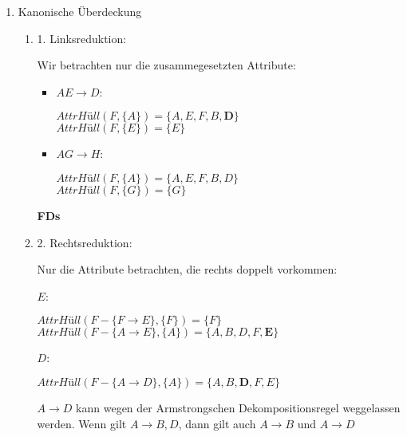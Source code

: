 \documentclass{lehramt-informatik-haupt}
\begin{document}
\begin{antwort}

\begin{enumerate}

\item Kanonische Überdeckung

\begin{enumerate}

%

\item 1. Linksreduktion:

Wir betrachten nur die zusammegesetzten Attribute:

\begin{itemize}
\item $AE \rightarrow D$:

$\textit{AttrHüll}(F, \{A\}) = \{A, E, F, B, \textbf{D}\}$ \\
$\textit{AttrHüll}(F, \{E\}) = \{E\}$

\item $AG \rightarrow H$:

$\textit{AttrHüll}(F, \{A\}) = \{A, E, F, B, D\}$ \\
$\textit{AttrHüll}(F, \{G\}) = \{G\}$
\end{itemize}

\textbf{FDs}


%

\item 2. Rechtsreduktion:

Nur die Attribute betrachten, die rechts doppelt vorkommen:

$E$:

$\textit{AttrHüll}(F - \{F \rightarrow E\}, \{F\}) = \{F\}$ \\
$\textit{AttrHüll}(F - \{A \rightarrow E\}, \{A\}) = \{A, B, D, F, \textbf{E}\}$

$D$:

$\textit{AttrHüll}(F - \{A \rightarrow D\}, \{A\}) = \{A, B, \textbf{D}, F, E\}$

$A \rightarrow D$ kann wegen der Armstrongschen Dekompositionsregel
weggelassen werden. Wenn gilt $A \rightarrow B, D$, dann gilt auch $A
\rightarrow B$ und $A \rightarrow D$


\end{enumerate}
\end{enumerate}
\end{antwort}
\end{document}
